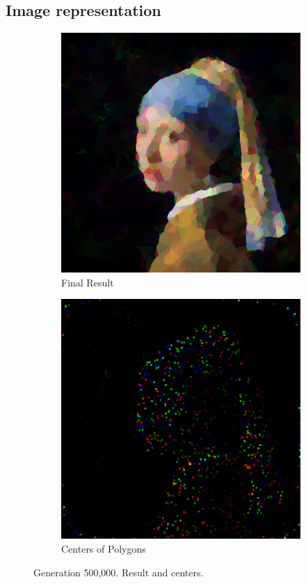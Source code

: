 \documentclass{article}
\begin{document}
\subsection{Image representation}
\begin{figure}[ht]
   	 \centering
     \begin{subfigure}[b]{0.45\textwidth}
         \centering
         \includegraphics[width=\textwidth]{latex_src/voronoi18.png}
         \caption{Final Result}
     \end{subfigure}
     \hfill
     \begin{subfigure}[b]{0.45\textwidth}
         \centering
         \includegraphics[width=\textwidth]{latex_src/voronoi18_1.png}
         \caption{Centers of Polygons}
     \end{subfigure}
      \caption{Generation 500,000. Result and centers.}
\end{figure}
\end{document}
